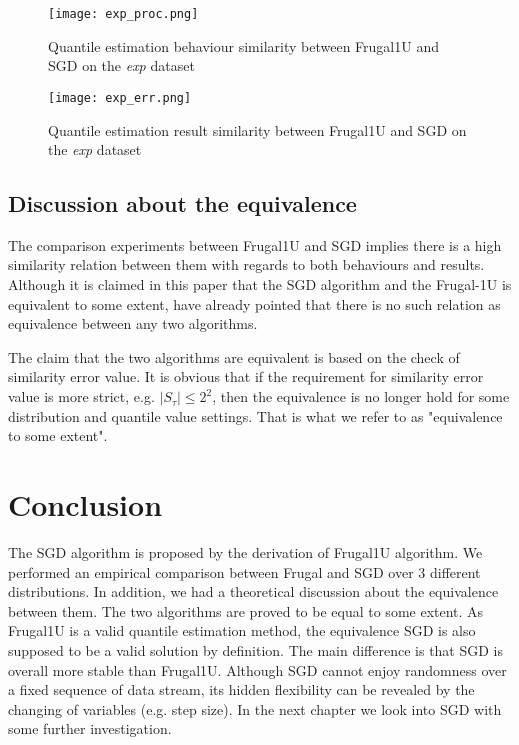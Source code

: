 \begin{figure}[h!]
    \centering
	\texttt{[image: exp\_proc.png]}
    \caption{Quantile estimation behaviour similarity between Frugal1U and SGD on the \textit{exp} dataset}
    \label{fig: exp_proc}
\end{figure}

\begin{figure}[h!]
    \centering
	\texttt{[image: exp\_err.png]}
    \caption{Quantile estimation result similarity between Frugal1U and SGD on the \textit{exp} dataset}
    \label{fig: exp_err}
\end{figure}

\subsection{Discussion about the equivalence}

The comparison experiments between Frugal1U and SGD implies there is a high similarity relation between them with regards to both behaviours and results.
Although it is claimed in this paper that the SGD algorithm and the Frugal-1U is equivalent to some extent, \citeauthor{blassWhenAreTwo2008}\cite{blassWhenAreTwo2008} have already pointed that there is no such relation as equivalence between any two algorithms. 

 The claim that the two algorithms are equivalent is based on the check of similarity error value. It is obvious that if the requirement for similarity error value is more strict, e.g. $|S_\tau| \leq 2^2$, then the equivalence is no longer hold for some distribution and quantile value settings. That is what we refer to as "equivalence to some extent".


\section{Conclusion}
The SGD algorithm is proposed by the derivation of Frugal1U algorithm. We performed an empirical comparison between Frugal and SGD over 3 different distributions. In addition, we had a theoretical discussion about the equivalence between them. The two algorithms are proved to be equal to some extent. As Frugal1U is a valid quantile estimation method, the equivalence SGD is also supposed to be a valid solution by definition.
The main difference is that SGD is overall more stable than Frugal1U.
Although SGD cannot enjoy randomness over a fixed sequence of data stream, its hidden flexibility can be revealed by the changing of variables (e.g. step size).
In the next chapter we look into SGD with some further investigation.